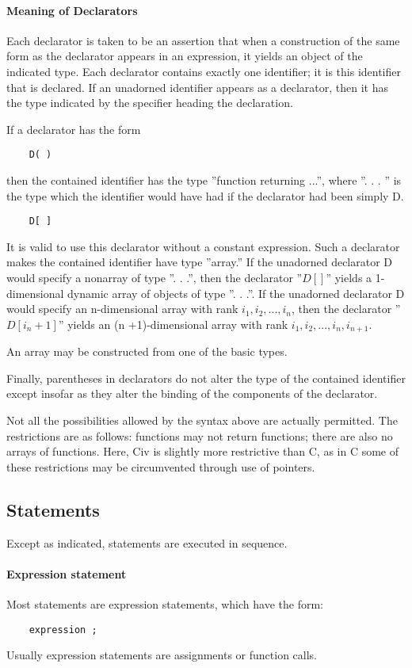\documentclass[a4paper]{article}
\begin{document}
\paragraph{Meaning of Declarators}
Each declarator is taken to be an assertion that when a construction of the same form as the declarator appears in an expression, it yields an object of the indicated type. Each declarator contains exactly one identifier; it is this identifier that is declared. If an unadorned identifier appears as a declarator, then it has the type indicated by the specifier heading the declaration.

If a declarator has the form
\begin{verbatim}
    D( )
\end{verbatim}
then the contained identifier has the type ''function returning ...'', where ''. . . '' is the type which the identifier would have had if the declarator had been simply D.
\begin{verbatim}
    D[ ]
\end{verbatim}
It is valid to use this declarator without a constant expression. Such a declarator makes the contained identifier have type ''array.'' If the unadorned declarator D would specify a nonarray of type ''. . .'', then the declarator ''$D[ ]$'' yields a 1-dimensional dynamic array of objects of type ''. . .''. If the unadorned declarator D would specify an n-dimensional array with rank $i_1 , i_2 , ... , i_n$, then the declarator ''$D[ i_n+1 ]$'' yields an (n +1)-dimensional array with rank $i_1 , i_2 , ... , i_n , i_{n+1}$.

An array may be constructed from one of the basic types.

Finally, parentheses in declarators do not alter the type of the contained identifier except insofar as they alter the binding of the components of the declarator.

Not all the possibilities allowed by the syntax above are actually permitted. The restrictions are as follows: functions may not return functions; there are also no arrays of functions. Here, Civ is slightly more restrictive than C, as in C some of these restrictions may be circumvented through use of pointers.


\subsection{Statements}
Except as indicated, statements are executed in sequence.

\paragraph{Expression statement}
Most statements are expression statements, which have the form:
\begin{verbatim}
    expression ;
\end{verbatim}
Usually expression statements are assignments or function calls.
\end{document}
